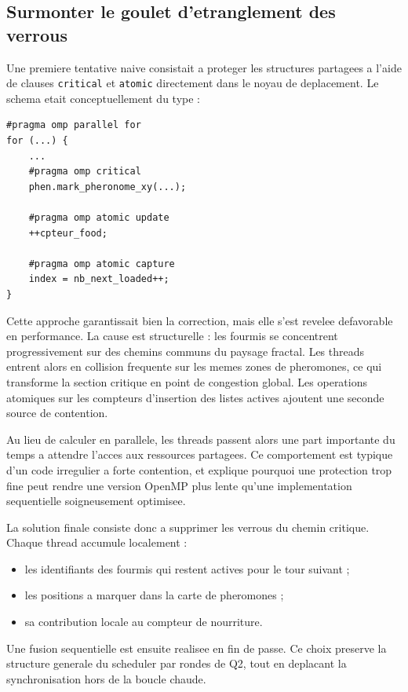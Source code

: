 \documentclass[11pt,a4paper]{article}
\begin{document}
\subsection{Surmonter le goulet d'etranglement des verrous}

Une premiere tentative naive consistait a proteger les structures partagees a l'aide de clauses \texttt{critical} et \texttt{atomic} directement dans le noyau de deplacement. Le schema etait conceptuellement du type :

\begin{verbatim}
#pragma omp parallel for
for (...) {
    ...
    #pragma omp critical
    phen.mark_pheronome_xy(...);

    #pragma omp atomic update
    ++cpteur_food;

    #pragma omp atomic capture
    index = nb_next_loaded++;
}
\end{verbatim}

Cette approche garantissait bien la correction, mais elle s'est revelee defavorable en performance. La cause est structurelle : les fourmis se concentrent progressivement sur des chemins communs du paysage fractal. Les threads entrent alors en collision frequente sur les memes zones de pheromones, ce qui transforme la section critique en point de congestion global. Les operations atomiques sur les compteurs d'insertion des listes actives ajoutent une seconde source de contention.

Au lieu de calculer en parallele, les threads passent alors une part importante du temps a attendre l'acces aux ressources partagees. Ce comportement est typique d'un code irregulier a forte contention, et explique pourquoi une protection trop fine peut rendre une version OpenMP plus lente qu'une implementation sequentielle soigneusement optimisee.

La solution finale consiste donc a supprimer les verrous du chemin critique. Chaque thread accumule localement :

\begin{itemize}[leftmargin=1.2em]
  \item les identifiants des fourmis qui restent actives pour le tour suivant ;
  \item les positions a marquer dans la carte de pheromones ;
  \item sa contribution locale au compteur de nourriture.
\end{itemize}

Une fusion sequentielle est ensuite realisee en fin de passe. Ce choix preserve la structure generale du scheduler par rondes de Q2, tout en deplacant la synchronisation hors de la boucle chaude.
\end{document}
